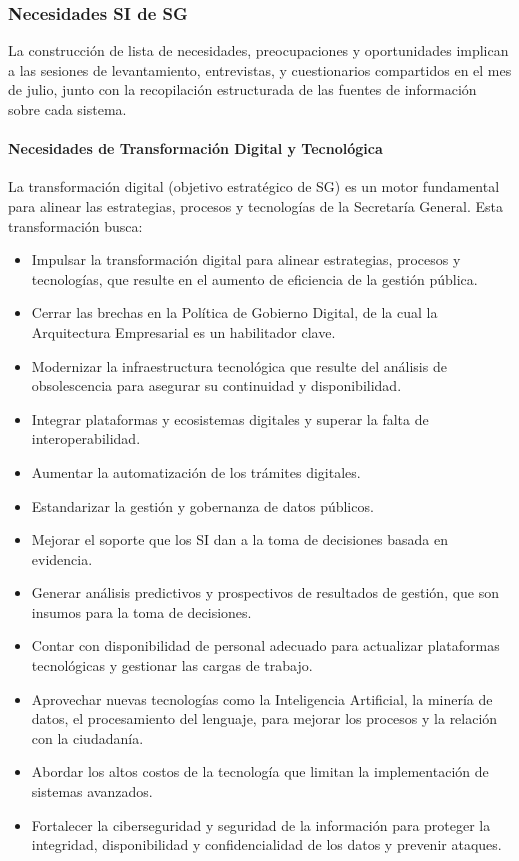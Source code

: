 \documentclass[
	a4paper, %
	12pt, %
]{include/CSSullivanBusinessReport}
\begin{document}
\subsubsection{Necesidades SI de SG}\label{sec:necesidades-si-de-sg}

La construcción de lista de necesidades, preocupaciones y oportunidades
implican a las sesiones de levantamiento, entrevistas, y cuestionarios
compartidos en el mes de julio, junto con la recopilación estructurada
de las fuentes de información sobre cada sistema.

\paragraph{Necesidades de Transformación Digital y
Tecnológica}\label{sec:necesidades-de-transformaciuxf3n-digital-y-tecnoluxf3gica}

La transformación digital (objetivo estratégico de SG) es un motor
fundamental para alinear las estrategias, procesos y tecnologías de la
Secretaría General. Esta transformación busca:

\begin{itemize}
\item
  Impulsar la transformación digital para alinear estrategias, procesos
  y tecnologías, que resulte en el aumento de eficiencia de la gestión
  pública.
\item
  Cerrar las brechas en la Política de Gobierno Digital, de la cual la
  Arquitectura Empresarial es un habilitador clave.
\item
  Modernizar la infraestructura tecnológica que resulte del análisis de
  obsolescencia para asegurar su continuidad y disponibilidad.
\item
  Integrar plataformas y ecosistemas digitales y superar la falta de
  interoperabilidad.
\item
  Aumentar la automatización de los trámites digitales.
\item
  Estandarizar la gestión y gobernanza de datos públicos.
\item
  Mejorar el soporte que los SI dan a la toma de decisiones basada en
  evidencia.
\item
  Generar análisis predictivos y prospectivos de resultados de gestión,
  que son insumos para la toma de decisiones.
\item
  Contar con disponibilidad de personal adecuado para actualizar
  plataformas tecnológicas y gestionar las cargas de trabajo.
\item
  Aprovechar nuevas tecnologías como la Inteligencia Artificial, la
  minería de datos, el procesamiento del lenguaje, para mejorar los
  procesos y la relación con la ciudadanía.
\item
  Abordar los altos costos de la tecnología que limitan la
  implementación de sistemas avanzados.
\item
  Fortalecer la ciberseguridad y seguridad de la información para
  proteger la integridad, disponibilidad y confidencialidad de los datos
  y prevenir ataques.
\end{itemize}
\end{document}
